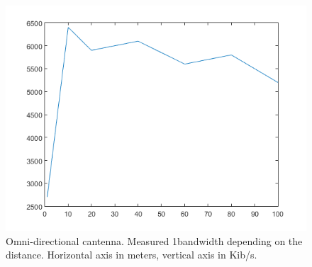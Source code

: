 \begin{figure}
\begin{center}
			
			\includegraphics[width=\figurewidth]{plots/omni_b.png}
			\caption{Omni-directional cantenna. Measured 1bandwidth depending on the distance. Horizontal axis in meters, vertical axis in Kib/s.}
			\label{img:dist:band:omni}
		\end{center}\end{figure}
		
